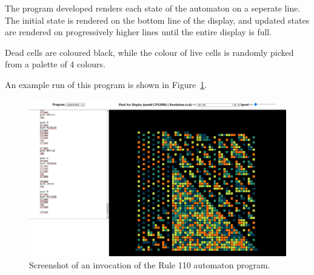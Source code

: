 \documentclass[11pt,a4paper]{scrartcl}
\begin{document}
The program developed renders each state of the automaton on a seperate line. The initial state is rendered on the bottom line of the display, and updated states are rendered on progressively higher lines until the entire display is full.

Dead cells are coloured black, while the colour of live cells is randomly picked from a palette of 4 colours.

An example run of this program is shown in Figure~\ref{fig:rule110}.

\begin{figure}
  \centering
  \includegraphics[width=\textwidth]{rule110}
  \caption{Screenshot of an invocation of the Rule 110 automaton program.}\label{fig:rule110}
\end{figure}

\newpage



\end{document}
